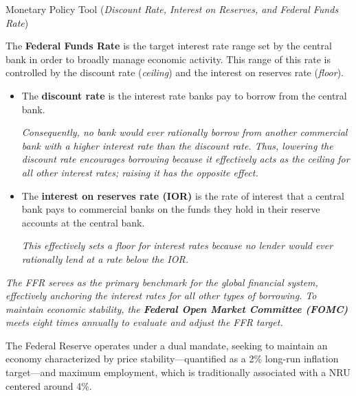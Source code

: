 \documentclass[10pt]{article}
\begin{document}
    \begin{core}[label=core:ffr]{Monetary Policy Tool (\textit{Discount Rate, Interest on Reserves, and Federal Funds Rate})}

      The \textbf{Federal Funds Rate} is the target interest rate range set by the central bank in order to broadly manage economic activity. This range of this rate is controlled by the discount rate (\textit{ceiling}) and the interest on reserves rate (\textit{floor}).

      \begin{itemize}

        \item The \textbf{discount rate} is the interest rate banks pay to borrow from the central bank.

        \textit{Consequently, no bank would ever rationally borrow from another commercial bank with a higher interest rate than the discount rate. Thus, lowering the discount rate encourages borrowing because it effectively acts as the ceiling for all other interest rates; raising it has the opposite effect.}

        \item The \textbf{interest on reserves rate (IOR)} is the rate of interest that a central bank pays to commercial banks on the funds they hold in their reserve accounts at the central bank.

        \textit{This effectively sets a floor for interest rates because no lender would ever rationally lend at a rate below the IOR.}

      \end{itemize}


      \textit{The FFR serves as the primary benchmark for the global financial system, effectively anchoring the interest rates for all other types of borrowing. To maintain economic stability, the \textbf{Federal Open Market Committee (FOMC)} meets eight times annually to evaluate and adjust the FFR target.}

    \end{core}

    The Federal Reserve operates under a dual mandate, seeking to maintain an economy characterized by price stability---quantified as a 2\% long-run inflation target---and maximum employment, which is traditionally associated with a NRU centered around 4\%.
\end{document}

